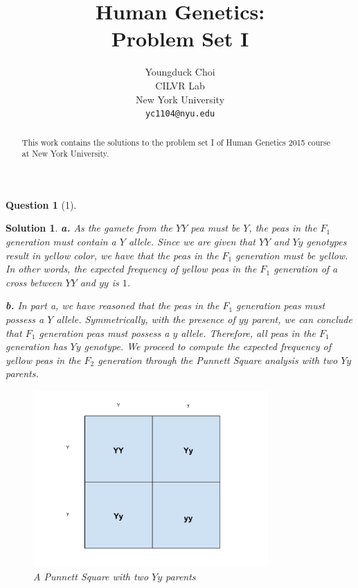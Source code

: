 \documentclass{article} %
\title{Human Genetics: \\
Problem Set I}
\author{
Youngduck Choi \\
CILVR Lab \\
New York University\\
\texttt{yc1104@nyu.edu} \\
}
\theoremstyle{quest}
\newtheorem*{question}{Question}
\newtheorem*{solution}{Solution}
\begin{document}
\maketitle

\begin{abstract}
This work contains the solutions to the problem set I
of Human Genetics 2015 course at New York University.
\end{abstract}

\begin{question}[1] 
\end{question}

\smallskip

\begin{solution}
\textbf{a.} As the gamete from the $YY$ pea must be $Y$, the peas in the $F_1$ generation
must contain a $Y$ allele. Since we are given that $YY$ and $Yy$ genotypes result
in yellow color, we have that the peas in the $F_1$ generation must be yellow. In other words,
the expected frequency of yellow peas in the $F_1$ generation of a cross between $YY$ and $yy$
is $1$. \\

\smallskip

\textbf{b.} In part a, we have reasoned that the peas in the $F_1$
generation peas must possess a $Y$ allele. Symmetrically, with the presence of $yy$ parent,
we can conclude that $F_1$ generation peas must possess a $y$ allele. Therefore,
all peas in the $F_1$ generation has $Yy$ genotype. We proceed to compute the expected
frequency of yellow peas in the $F_2$ generation through the Punnett Square analysis with
two $Yy$ parents.

\begin{figure}[h!]
  \caption{A Punnett Square with two $Yy$ parents}
  \centering
    \includegraphics[width=0.8\textwidth]{Punnett.pdf}
\end{figure}


\end{solution}
\end{document}
